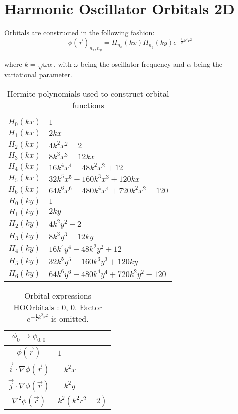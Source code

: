 \chapter{Harmonic Oscillator Orbitals 2D}
\label{appendix:SymPyHO}

Orbitals are constructed in the following fashion:
\begin{equation*}
\phi(\vec r)_{n_x, n_y} = H_{n_x}(kx)H_{n_y}(ky)e^{-\frac{1}{2}k^2r^2}
\end{equation*}   

where $k = \sqrt{\omega\alpha}$, with $\omega$ being the oscillator frequency and $\alpha$ being the variational parameter.  



\begin{table}
\begin{center}
\begin{tabular}{c|l}
$H_{0}(kx)$ & $1$\\
$H_{1}(kx)$ & $2 k x$\\
$H_{2}(kx)$ & $4 k^{2} x^{2} -2$\\
$H_{3}(kx)$ & $8 k^{3} x^{3} - 12 k x$\\
$H_{4}(kx)$ & $16 k^{4} x^{4} - 48 k^{2} x^{2} + 12$\\
$H_{5}(kx)$ & $32 k^{5} x^{5} - 160 k^{3} x^{3} + 120 k x$\\
$H_{6}(kx)$ & $64 k^{6} x^{6} - 480 k^{4} x^{4} + 720 k^{2} x^{2} -120$\\
\hline
$H_{0}(ky)$ & $1$\\
$H_{1}(ky)$ & $2 k y$\\
$H_{2}(ky)$ & $4 k^{2} y^{2} -2$\\
$H_{3}(ky)$ & $8 k^{3} y^{3} - 12 k y$\\
$H_{4}(ky)$ & $16 k^{4} y^{4} - 48 k^{2} y^{2} + 12$\\
$H_{5}(ky)$ & $32 k^{5} y^{5} - 160 k^{3} y^{3} + 120 k y$\\
$H_{6}(ky)$ & $64 k^{6} y^{6} - 480 k^{4} y^{4} + 720 k^{2} y^{2} -120$\\
\end{tabular}
\caption{Hermite polynomials used to construct orbital functions}
\end{center}
\end{table}

\clearpage

\begin{table}
\begin{center}
\begin{tabular}{c|l}
$\phi_{0} \rightarrow \phi_{0, 0}$\\
\hline
$\phi(\vec r)$ & $1$\\
\hline
$\vec i\cdot \nabla \phi(\vec r)$ & $- k^{2} x$\\
$\vec j\cdot \nabla \phi(\vec r)$ & $- k^{2} y$\\
\hline
$\nabla^2 \phi(\vec r)$ & $k^{2} \left(k^{2} r^{2} -2\right)$\\
\end{tabular}
\caption{Orbital expressions HOOrbitals : 0, 0. Factor $e^{- \frac{1}{2} k^{2} r^{2}}$ is omitted.}
\end{center}
\end{table}


